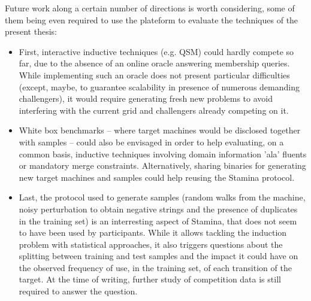 Future work along a certain number of directions is worth considering, some of them being even required to use the plateform to evaluate the techniques of the present thesis:

\begin{itemize}

\item First, interactive inductive techniques (e.g. QSM) could hardly compete so far, due to the absence of an online oracle answering membership queries. While implementing such an oracle does not present particular difficulties (except, maybe, to guarantee scalability in presence of numerous demanding challengers), it would require generating fresh new problems to avoid interfering with the current grid and challengers already competing on it. 

\item White box benchmarks -- where target machines would be disclosed together with samples -- could also be envisaged in order to help evaluating, on a common basis, inductive techniques involving domain information 'ala' fluents or mandatory merge constraints. Alternatively, sharing binaries for generating new target machines and samples could help reusing the Stamina protocol. 

\item Last, the protocol used to generate samples (random walks from the machine, noisy perturbation to obtain negative strings and the presence of duplicates in the training set) is an interresting aspect of Stamina, that does not seem to have been used by participants. While it allows tackling the induction problem with statistical approaches, it also triggers questions about the splitting between training and test samples and the impact it could have on the observed frequency of use, in the training set, of each transition of the target. At the time of writing, further study of competition data is still required to answer the question.

\end{itemize}
